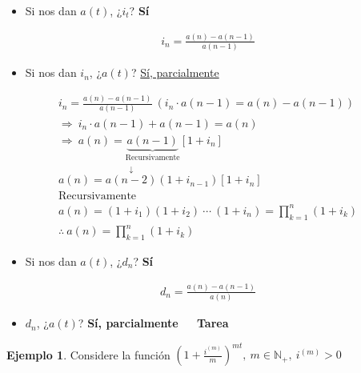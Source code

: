 \documentclass[
]{book}
\providecommand{\tightlist}{%
  \setlength{\itemsep}{0pt}\setlength{\parskip}{0pt}}
\theoremstyle{definition}
\theoremstyle{definition}
\newtheorem{example}{Ejemplo}[chapter]
\theoremstyle{definition}
\theoremstyle{definition}
\theoremstyle{remark}
\begin{document}
\begin{itemize}
\tightlist
\item
  Si nos dan \(a(t)\), ¿\(i_t\)? \textbf{Sí}
\end{itemize}

\begin{align*}
&i_n = \frac{a(n)-a(n-1)}{a(n-1)}&
\end{align*}

\begin{itemize}
\tightlist
\item
  Si nos dan \(i_n\), ¿\(a(t)\)? \underline{Sí, parcialmente}
\end{itemize}

\begin{align*}
&i_n = \frac{a(n)-a(n-1)}{a(n-1)} \: \left(i_n \cdot a(n-1) = a(n) - a(n-1) \right) &\\
&\Longrightarrow\: i_n \cdot a(n-1) + a(n-1) = a(n)&\\
&\Longrightarrow\: a(n) = \underbrace{a(n-1)}_{\text{Recursivamente}}\left[1+i_n \right] &\\
&a(n) = \stackrel{\mbox{$\downarrow$}}{a(n-2)}\left( 1+i_{n-1}\right) \left[1+i_n\right]&\\
&\text{Recursivamente}&\\
&a(n) =  \left(1 + i_1 \right) \left(1+i_2 \right) \:\cdots\: \left( 1 + i_n\right) = \prod_{k=1}^{n} \left( 1+ i_k\right)&\\
&\boxed{\therefore \: a(n) = \prod_{k=1}^{n} \left( 1+ i_k\right)}&
\end{align*}

\begin{itemize}
\tightlist
\item
  Si nos dan \(a(t)\), ¿\(d_n\)? \textbf{Sí}
\end{itemize}

\begin{align*}
&d_n = \frac{a(n)-a(n-1)}{a(n)}&
\end{align*}

\begin{itemize}
\tightlist
\item
  \(d_n\), ¿\(a(t)\)? \textbf{Sí, parcialmente} \(\quad\) \textbf{{Tarea}}
\end{itemize}

\begin{example}
Considere la función \(\left( 1 + \frac{i^{(m)}}{m}\right)^{mt}, \: m\in \mathbb{N}_+, \: i^{(m)}>0\)
\end{example}
\end{document}
